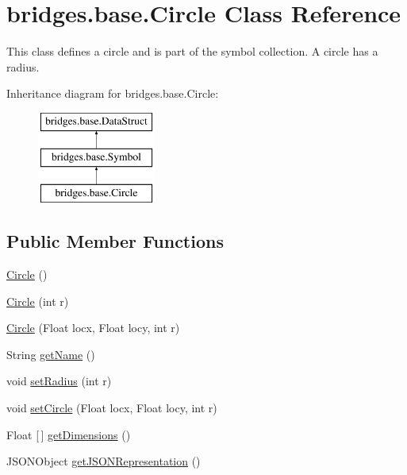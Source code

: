 \hypertarget{classbridges_1_1base_1_1_circle}{}\section{bridges.\+base.\+Circle Class Reference}
\label{classbridges_1_1base_1_1_circle}


This class defines a circle and is part of the symbol collection. A circle has a radius.  


Inheritance diagram for bridges.\+base.\+Circle\+:\begin{figure}[H]
\begin{center}
\leavevmode
\includegraphics[height=3.000000cm]{classbridges_1_1base_1_1_circle}
\end{center}
\end{figure}
\subsection*{Public Member Functions}
\begin{DoxyCompactItemize}
\item 
\mbox{\hyperlink{classbridges_1_1base_1_1_circle_a807231dff01120041d7d209d049e3029}{Circle}} ()
\item 
\mbox{\hyperlink{classbridges_1_1base_1_1_circle_abfd82d0ca10193a51234657253051beb}{Circle}} (int r)
\item 
\mbox{\hyperlink{classbridges_1_1base_1_1_circle_a5c7d699257b3e67ac7a3c52e9f05b376}{Circle}} (Float locx, Float locy, int r)
\item 
String \mbox{\hyperlink{classbridges_1_1base_1_1_circle_a3782ea68f0419747c00bd8b2bfa31462}{get\+Name}} ()
\item 
void \mbox{\hyperlink{classbridges_1_1base_1_1_circle_a2587268c948c5e65dd35d4803d133fb1}{set\+Radius}} (int r)
\item 
void \mbox{\hyperlink{classbridges_1_1base_1_1_circle_ab8c228507cbf3067c40d74e35563d1cf}{set\+Circle}} (Float locx, Float locy, int r)
\item 
Float \mbox{[}$\,$\mbox{]} \mbox{\hyperlink{classbridges_1_1base_1_1_circle_af16fe10d1dc5bbac325284f91e66b42a}{get\+Dimensions}} ()
\item 
J\+S\+O\+N\+Object \mbox{\hyperlink{classbridges_1_1base_1_1_circle_ad6a8b8e2dca562fd3fa5254ee861ed70}{get\+J\+S\+O\+N\+Representation}} ()
\end{DoxyCompactItemize}
